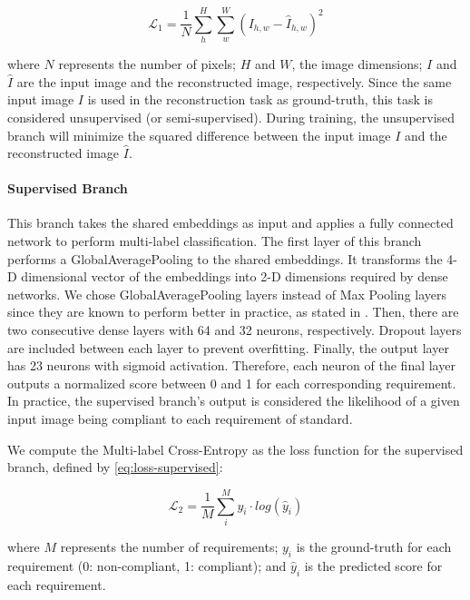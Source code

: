 \begin{equation}
\label{eq:loss-unsupervised}
\mathcal{L}_1 = \frac{1}{N} \sum_h^H \sum_w^W ({I_{h,w} - \hat{I}_{h,w}})^2
\end{equation}

\noindent where $N$ represents the number of pixels; $H$ and $W$, the image dimensions; $I$ and $\hat{I}$ are the input image and the reconstructed image, respectively. Since the same input image $I$ is used in the reconstruction task as ground-truth, this task is considered unsupervised (or semi-supervised). During training, the unsupervised branch will minimize the squared difference between the input image $I$ and the reconstructed image $\hat{I}$.

\paragraph{Supervised Branch}

This branch takes the shared embeddings as input and applies a fully connected network to perform multi-label classification. The first layer of this branch performs a GlobalAveragePooling to the shared embeddings. It transforms the 4-D dimensional vector of the embeddings into 2-D dimensions required by dense networks. We chose GlobalAveragePooling layers instead of Max Pooling layers since they are known to perform better in practice, as stated in \cite{zhou2016learning}. Then, there are two consecutive dense layers with 64 and 32 neurons, respectively. Dropout layers are included between each layer to prevent overfitting. Finally, the output layer has 23 neurons with sigmoid activation. Therefore, each neuron of the final layer outputs a normalized score between 0 and 1 for each corresponding requirement. In practice, the supervised branch's output is considered the likelihood of a given input image being compliant to each requirement of \icao standard.

We compute the Multi-label Cross-Entropy as the loss function for the supervised branch, defined by \autoref{eq:loss-supervised}:

\begin{equation}
\label{eq:loss-supervised}
\mathcal{L}_2 = \frac{1}{M} \sum_i^M {y_i \cdot log(\hat{y}_i)}
\end{equation}

\noindent where $M$ represents the number of requirements; $y_i$ is the ground-truth for each requirement (0: non-compliant, 1: compliant); and $\hat{y}_i$ is the predicted score for each requirement.

